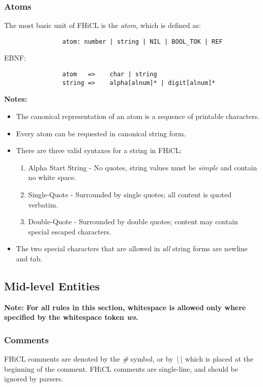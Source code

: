 \documentclass{article}
\begin{document}
		\subsubsection{Atoms}
			The most basic unit of FHiCL is the \emph{atom},
			which is defined as: 
			\begin{verbatim}
				atom: number | string | NIL | BOOL_TOK | REF
			\end{verbatim}
			\vspace{1mm}
			EBNF:
			\begin{verbatim}
				atom   =>    char | string
				string =>    alpha[alnum]* | digit[alnum]*
			\end{verbatim}
			\vspace{1mm}
			\par
			\bf Notes: \rm
			\begin{itemize}
				\item The canonical representation of an atom is a sequence of printable characters.
				\item Every atom can be requested in canonical string form.
				\item There are three valid syntaxes for a string in FHiCL:
				\begin{enumerate}
					\item Alpha Start String - No quotes, string values must be \emph{simple}
						and contain no white space.
					\item Single-Quote - Surrounded by single quotes;
						all content is quoted verbatim.
					\item Double-Quote - Surrounded by double quotes;
						content may contain special escaped characters.
				\end{enumerate}
				\item The two special characters that are allowed in \emph{all} string forms are newline and tab.
			\end{itemize}
			
	\subsection{Mid-level Entities}
		\bf Note: \rm For all rules in this section,
		whitespace is allowed only where specified by the whitespace token \emph{ws}.
		\subsubsection{Comments}
			FHiCL comments are denoted by the \emph{\#} symbol,
			or by \emph{\textbackslash\textbackslash}
			which is placed at the beginning of the comment.
			FHiCL comments are single-line,
			and should be ignored by parsers.
\end{document}
